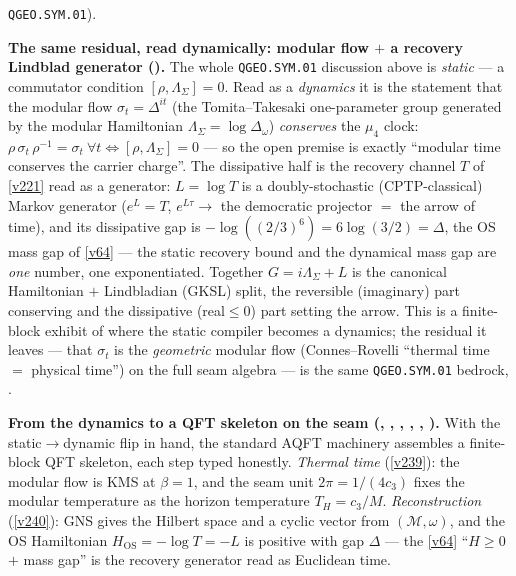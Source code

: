 \documentclass[11pt,a4paper]{article}
\begin{document}
\begin{keybox}
\texttt{QGEO.SYM.01}).
\par\smallskip\noindent\textbf{The same residual, read dynamically: modular flow $+$ a recovery
Lindblad generator ().} The whole \texttt{QGEO.SYM.01}
discussion above is \emph{static} --- a commutator condition $[\rho,\Lambda_\Sigma]=0$. Read as a
\emph{dynamics} it is the statement that the modular flow $\sigma_t=\Delta^{it}$ (the Tomita--Takesaki
one-parameter group generated by the modular Hamiltonian $\Lambda_\Sigma=\log\Delta_\omega$)
\emph{conserves} the $\mu_4$ clock: $\rho\,\sigma_t\,\rho^{-1}=\sigma_t\ \forall t\Leftrightarrow
[\rho,\Lambda_\Sigma]=0$ --- so the open premise is exactly ``modular time conserves the carrier
charge''. The dissipative half is the recovery channel $T$ of \vref{v221} read as a generator:
$L=\log T$ is a doubly-stochastic (CPTP-classical) Markov generator ($e^{L}=T$, $e^{L\tau}\to$ the
democratic projector $=$ the arrow of time), and its dissipative gap is $-\log((2/3)^6)=6\log(3/2)=
\Delta$, the OS mass gap of \vref{v64} --- the static recovery bound and the dynamical mass gap are
\emph{one} number, one exponentiated. Together $G=i\Lambda_\Sigma+L$ is the canonical Hamiltonian
$+$ Lindbladian (GKSL) split, the reversible (imaginary) part conserving and the dissipative
(real$\le0$) part setting the arrow. This is a finite-block exhibit of where the static compiler
becomes a dynamics; the residual it leaves --- that $\sigma_t$ is the \emph{geometric} modular flow
(Connes--Rovelli ``thermal time $=$ physical time'') on the full seam algebra --- is the same
\texttt{QGEO.SYM.01} bedrock, \mO.
\par\smallskip\noindent\textbf{From the dynamics to a QFT skeleton on the seam
(, ,
, ,
, ).}
With the static$\to$dynamic flip in hand, the standard AQFT machinery assembles a
finite-block QFT skeleton, each step typed honestly. \emph{Thermal time}
(\vref{v239}): the modular flow is KMS at $\beta=1$, and the seam unit
$2\pi=1/(4c_3)$ fixes the modular temperature as the horizon temperature
$T_H=c_3/M$. \emph{Reconstruction} (\vref{v240}): GNS gives the Hilbert space and a
cyclic vector from $(\mathcal M,\omega)$, and the OS Hamiltonian
$H_{\mathrm{OS}}=-\log T=-L$ is positive with gap $\Delta$ --- the \vref{v64}
``$H\ge0$ $+$ mass gap'' is the recovery generator read as Euclidean time.

\end{keybox}
\end{document}
